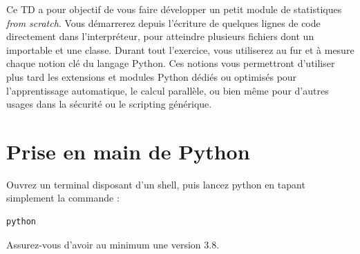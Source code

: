 \documentclass[11pt,a4paper]{article}
\begin{document}
\EncadreTitre

\bigskip


%
%

\bigskip


Ce TD a pour objectif de vous faire développer un petit module de statistiques \textit{from scratch}.
Vous démarrerez depuis l'écriture de quelques lignes de code directement dans l'interpréteur, pour atteindre plusieurs fichiers dont un importable et une classe.
Durant tout l'exercice, vous utiliserez au fur et à mesure chaque notion clé du langage Python.
Ces notions vous permettront d'utiliser plus tard les extensions et modules Python dédiés ou optimisés pour l'apprentissage automatique, le calcul parallèle, ou bien même pour d'autres usages dans la sécurité ou le scripting générique.

\bigskip

\section{Prise en main de Python}

\bigskip

Ouvrez un terminal disposant d'un shell, puis lancez python en tapant simplement la commande :

\begin{center}
\begin{lstlisting}[style=sh,morekeywords={floor,ceil}]
python \end{lstlisting}
\end{center}

Assurez-vous d'avoir au minimum une version 3.8.
\end{document}
